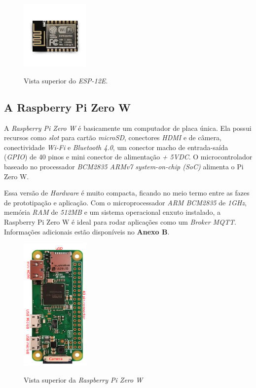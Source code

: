 \begin{figure}[H]
	\centering
	\caption{Vista superior do \textit{ESP-12E}.}
	\includegraphics[width=0.3\textwidth]{figuras/ESP-12E.png}
	\label{fig:esp12e}
\end{figure} 



\subsection{A Raspberry Pi Zero W}

A \textit{Raspberry Pi Zero W} é basicamente um computador de placa única. Ela possui recursos como \textit{slot} para cartão \textit{microSD}, conectores \textit{HDMI} e de câmera, conectividade \textit{Wi-Fi} e \textit{Bluetooth 4.0}, um conector macho de entrada-saída (\textit{GPIO}) de 40 pinos e mini conector de alimentação \textit{+ 5VDC}. O microcontrolador baseado no processador \textit{BCM2835 ARMv7 system-on-chip (SoC)} alimenta o Pi Zero W.

Essa versão de \textit{Hardware} é muito compacta, ficando no meio termo entre as fazes de prototipação e aplicação. Com o microprocessador \textit{ARM BCM2835} de \textit{1GHz}, memória \textit{RAM} de \textit{512MB} e um sistema operacional enxuto instalado, a Raspberry Pi Zero W é ideal para rodar aplicações como um \textit{Broker MQTT}. Informações adicionais estão disponíveis no \textbf{Anexo B}.

\begin{figure}[H]
	\centering
	\caption{Vista superior da \textit{Raspberry Pi Zero W}}
	\includegraphics[width=0.3\textwidth, angle = 90]{figuras/rasp_zerow.png}
	\label{fig:rasppizerow}
\end{figure} 

